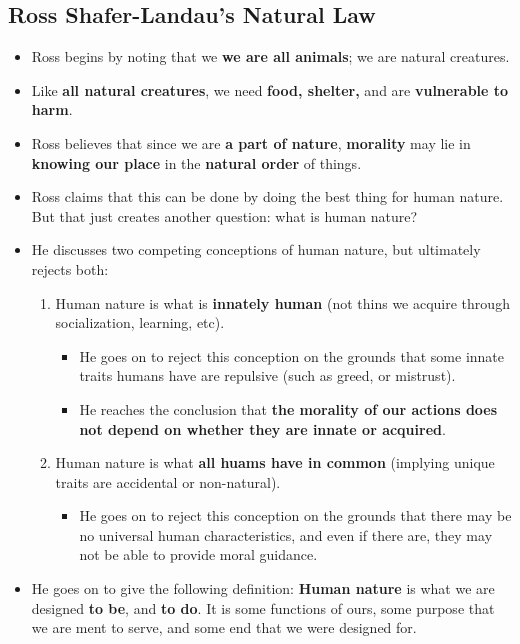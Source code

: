 \documentclass[16pt]{article}
\begin{document}
    \subsection*{Ross Shafer-Landau's Natural Law}
    \begin{itemize}
        \item Ross begins by noting that we \textbf{we are all animals}; we are natural creatures.
        \item Like \textbf{all natural creatures}, we need \textbf{food, shelter,} and are \textbf{vulnerable to harm}.
        \item Ross believes that since we are \textbf{a part of nature}, \textbf{morality} may lie in \textbf{knowing our place} in the \textbf{natural order} of things.
        \item Ross  claims that this can be done by doing the best thing for human nature. But that just creates another question: what is human nature?
        \item He discusses two competing conceptions of human nature, but ultimately rejects both:
        \begin{enumerate}
            \item Human nature is what is \textbf{innately human} (not thins we acquire through socialization, learning, etc).
            \begin{itemize}
                \item He goes on to reject this conception on the grounds that some innate traits humans have are repulsive (such as greed, or mistrust).
                \item He reaches the conclusion that \textbf{the morality of our actions does not depend on whether they are innate or acquired}.
            \end{itemize}
            \item Human nature is what \textbf{all huams have in common} (implying unique traits are accidental or non-natural).
            \begin{itemize}
                \item He goes on to reject this conception on the grounds that there may be no universal human characteristics, and even if there are, they may not be able to provide moral guidance.
            \end{itemize}
        \end{enumerate}
        \item He goes on to give the following definition: \textbf{Human nature} is what we are designed \textbf{to be}, and \textbf{to do}. It is some functions of ours, some purpose that we are ment to serve, and some end that we were designed for.

\end{itemize}
\end{document}
